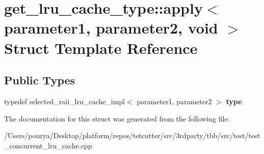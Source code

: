 \hypertarget{structget__lru__cache__type_1_1apply_3_01parameter1_00_01parameter2_00_01void_01_4}{}\section{get\+\_\+lru\+\_\+cache\+\_\+type\+:\+:apply$<$ parameter1, parameter2, void $>$ Struct Template Reference}
\label{structget__lru__cache__type_1_1apply_3_01parameter1_00_01parameter2_00_01void_01_4}
\subsection*{Public Types}
\begin{DoxyCompactItemize}
\item 
\hypertarget{structget__lru__cache__type_1_1apply_3_01parameter1_00_01parameter2_00_01void_01_4_a0c5a7c3c6b5cb8a12094ca7368f1b4df}{}typedef selected\+\_\+raii\+\_\+lru\+\_\+cache\+\_\+impl$<$ parameter1, parameter2 $>$ {\bfseries type}\label{structget__lru__cache__type_1_1apply_3_01parameter1_00_01parameter2_00_01void_01_4_a0c5a7c3c6b5cb8a12094ca7368f1b4df}

\end{DoxyCompactItemize}


The documentation for this struct was generated from the following file\+:\begin{DoxyCompactItemize}
\item 
/\+Users/pourya/\+Desktop/platform/repos/tetcutter/src/3rdparty/tbb/src/test/test\+\_\+concurrent\+\_\+lru\+\_\+cache.\+cpp\end{DoxyCompactItemize}
